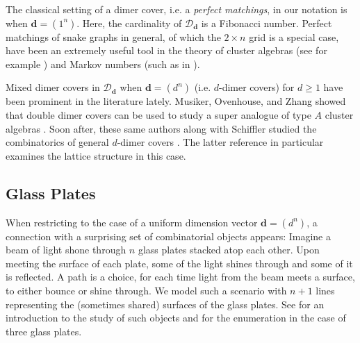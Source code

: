 \documentclass{amsart}
\def\bfd{{\mathbf{d}}}
\theoremstyle{definition}
\begin{document}
\label{sec:uniformvector}

The classical setting of a dimer cover, i.e. a \emph{perfect matchings}, in our notation is when $\mathbf{d} = (1^n)$. Here, the cardinality of $\mathcal{D}_{\mathbf{d}}$ is a Fibonacci number. Perfect matchings of snake graphs in general, of which the $2 \times n$ grid is a special case, have been an extremely useful tool in the theory of cluster algebras (see for example \cite{musiker2010cluster}) and Markov numbers (such as in \cite{LLRS}). 

Mixed dimer covers in $\mathcal{D}_{\mathbf{d}}$ when $\bfd = (d^n)$ (i.e. $d$-dimer covers) for $d \geq 1$ have been prominent in the literature lately. Musiker, Ovenhouse, and Zhang showed that double dimer covers can be used to study a super analogue of type $A$ cluster algebras \cite{zbMATH07567672}. Soon after, these same authors along with Schiffler studied the combinatorics of general $d$-dimer covers  \cite{zbMATH08171225}. The latter reference in particular examines the lattice structure in this case. 

\subsection{Glass Plates}
When restricting to the case of a uniform dimension vector
$\bfd=(d^n)$, a connection with a surprising set of
combinatorial objects appears: Imagine a beam of light
shone through $n$ glass plates stacked atop each other.
Upon meeting the surface of each plate, some of the light shines through
and some of it is reflected. A path is a choice,
for each time light from the beam meets a surface,
to either bounce or shine through. We model
such a scenario with $n+1$ lines representing
the (sometimes shared) surfaces of the glass plates.
See \cite{hoggatt79} for an introduction to the study of such objects and \cite[A006356]{OEIS} for the enumeration in the case of three glass plates.
\end{document}
